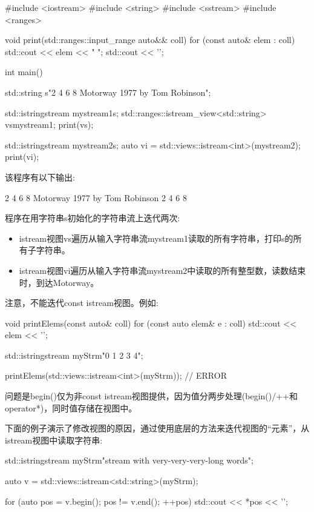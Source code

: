 \begin{cpp}
#include <iostream>
#include <string>
#include <sstream>
#include <ranges>

void print(std::ranges::input_range auto&& coll)
{
	for (const auto& elem : coll) {
		std::cout << elem << " ";
	}
	std::cout << '\n';
}

int main()
{
	std::string s{"2 4 6 8 Motorway 1977 by Tom Robinson"};
	
	std::istringstream mystream1{s};
	std::ranges::istream_view<std::string> vs{mystream1};
	print(vs);
	
	std::istringstream mystream2{s};
	auto vi = std::views::istream<int>(mystream2);
	print(vi);
}
\end{cpp}

该程序有以下输出:

\begin{shell}
2 4 6 8 Motorway 1977 by Tom Robinson
2 4 6 8
\end{shell}

程序在用字符串s初始化的字符串流上迭代两次:

\begin{itemize}
\item
istream视图vs遍历从输入字符串流mystream1读取的所有字符串，打印s的所有子字符串。

\item
istream视图vi遍历从输入字符串流mystream2中读取的所有整型数，读数结束时，到达Motorway。
\end{itemize}


注意，不能迭代const istream视图。例如:

\begin{cpp}
void printElems(const auto& coll) {
	for (const auto elem& e : coll) {
		std::cout << elem << '\n';
	}
}

std::istringstream myStrm{"0 1 2 3 4"};

printElems(std::views::istream<int>(myStrm)); // ERROR
\end{cpp}

问题是begin()仅为非const istream视图提供，因为值分两步处理(begin()/++和operator*)，同时值存储在视图中。

下面的例子演示了修改视图的原因，通过使用底层的方法来迭代视图的“元素”，从istream视图中读取字符串:

\begin{cpp}
std::istringstream myStrm{"stream with very-very-very-long words"};

auto v = std::views::istream<std::string>(myStrm);

for (auto pos = v.begin(); pos != v.end(); ++pos) {
	std::cout << *pos << '\n';
}
\end{cpp}


